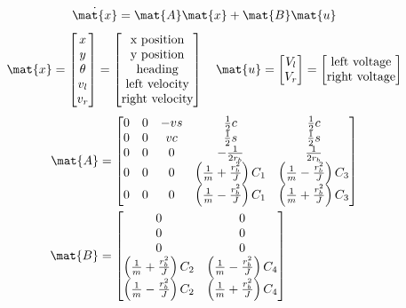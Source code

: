 \begin{theorem}
  \begin{equation*}
    \dot{\mat{x}} = \mat{A}\mat{x} + \mat{B}\mat{u}
  \end{equation*}
  \begin{equation*}
    \mat{x} =
    \begin{bmatrix}
      x \\
      y \\
      \theta \\
      v_l \\
      v_r
    \end{bmatrix} =
    \begin{bmatrix}
      \text{x position} \\
      \text{y position} \\
      \text{heading} \\
      \text{left velocity} \\
      \text{right velocity}
    \end{bmatrix}
    \quad
    \mat{u} =
    \begin{bmatrix}
      V_l \\
      V_r
    \end{bmatrix} =
    \begin{bmatrix}
      \text{left voltage} \\
      \text{right voltage}
    \end{bmatrix}
  \end{equation*}
  \begin{align}
    \mat{A} &=
    \begin{bmatrix}
      0 & 0 & -vs & \frac{1}{2}c & \frac{1}{2}c \\
      0 & 0 & vc & \frac{1}{2}s & \frac{1}{2}s \\
      0 & 0 & 0 & -\frac{1}{2r_b} & \frac{1}{2r_b} \\
      0 & 0 & 0 & \left(\frac{1}{m} + \frac{r_b^2}{J}\right) C_1 &
        \left(\frac{1}{m} - \frac{r_b^2}{J}\right) C_3 \\
      0 & 0 & 0 & \left(\frac{1}{m} - \frac{r_b^2}{J}\right) C_1 &
        \left(\frac{1}{m} + \frac{r_b^2}{J}\right) C_3
    \end{bmatrix} \\
    \mat{B} &=
    \begin{bmatrix}
      0 & 0 \\
      0 & 0 \\
      0 & 0 \\
      \left(\frac{1}{m} + \frac{r_b^2}{J}\right) C_2 &
      \left(\frac{1}{m} - \frac{r_b^2}{J}\right) C_4 \\
      \left(\frac{1}{m} - \frac{r_b^2}{J}\right) C_2 &
      \left(\frac{1}{m} + \frac{r_b^2}{J}\right) C_4
    \end{bmatrix}
  \end{align}


\end{theorem}
